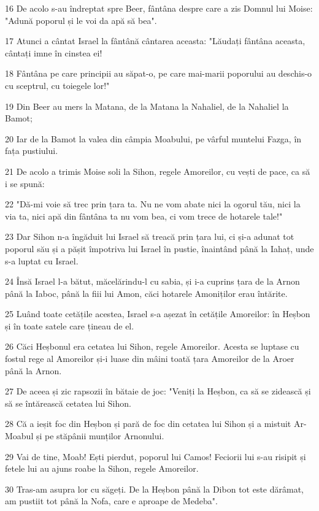 \par 16 De acolo s-au îndreptat spre Beer, fântâna despre care a zis Domnul lui Moise: "Adună poporul și le voi da apă să bea".
\par 17 Atunci a cântat Israel la fântână cântarea aceasta: "Lăudați fântâna aceasta, cântați imne în cinstea ei!
\par 18 Fântâna pe care principii au săpat-o, pe care mai-marii poporului au deschis-o cu sceptrul, cu toiegele lor!"
\par 19 Din Beer au mers la Matana, de la Matana la Nahaliel, de la Nahaliel la Bamot;
\par 20 Iar de la Bamot la valea din câmpia Moabului, pe vârful muntelui Fazga, în fața pustiului.
\par 21 De acolo a trimis Moise soli la Sihon, regele Amoreilor, cu vești de pace, ca să i se spună:
\par 22 "Dă-mi voie să trec prin țara ta. Nu ne vom abate nici la ogorul tău, nici la via ta, nici apă din fântâna ta nu vom bea, ci vom trece de hotarele tale!"
\par 23 Dar Sihon n-a îngăduit lui Israel să treacă prin țara lui, ci și-a adunat tot poporul său și a pășit împotriva lui Israel în pustie, înaintând până la Iahaț, unde s-a luptat cu Israel.
\par 24 Însă Israel l-a bătut, măcelărindu-l cu sabia, și i-a cuprins țara de la Arnon până la Iaboc, până la fiii lui Amon, căci hotarele Amoniților erau întărite.
\par 25 Luând toate cetățile acestea, Israel s-a așezat în cetățile Amoreilor: în Heșbon și în toate satele care țineau de el.
\par 26 Căci Heșbonul era cetatea lui Sihon, regele Amoreilor. Acesta se luptase cu fostul rege al Amoreilor și-i luase din mâini toată țara Amoreilor de la Aroer până la Arnon.
\par 27 De aceea și zic rapsozii în bătaie de joc: "Veniți la Heșbon, ca să se zidească și să se întărească cetatea lui Sihon.
\par 28 Că a ieșit foc din Heșbon și pară de foc din cetatea lui Sihon și a mistuit Ar-Moabul și pe stăpânii munților Arnonului.
\par 29 Vai de tine, Moab! Ești pierdut, poporul lui Camos! Feciorii lui s-au risipit și fetele lui au ajuns roabe la Sihon, regele Amoreilor.
\par 30 Tras-am asupra lor cu săgeți. De la Heșbon până la Dibon tot este dărâmat, am pustiit tot până la Nofa, care e aproape de Medeba".
